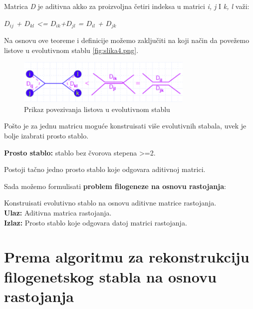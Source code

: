 \begin{teorema}
Matrica \textit{D} je aditivna akko za proizvoljna \v{c}etiri indeksa u matrici \textit{i, j} I \textit{k, l} va\v{z}i:

\begin{center}
\textit{$D_{ij}$ + $D_{kl}$ \textless= $D_{ik}$+$D_{jl}$ = $D_{il}$ + $D_{jk}$}
\end{center}

\end{teorema}

Na osnovu ove teoreme i definicije mo\v{z}emo zaklju\v{c}iti na koji na\v{c}in da pove\v{z}emo listove u evolutivnom stablu \ref{fig:slika4.png}.
\begin{figure}[h]
\centering
\includegraphics[width=0.75\textwidth]{poglavlja/7/slike/slika4.png}
\caption{Prikaz povezivanja listova u evolutivnom stablu}
\end{figure} 

Po\v{s}to je za jednu matricu mogu\'ce konstruisati vi\v{s}e evolutivnih stabala, uvek je bolje izabrati prosto stablo. 

\begin{definicija}
\textbf{Prosto stablo:} stablo bez \v{c}vorova stepena \textgreater=2.
\end{definicija}

\begin{teorema}
Postoji ta\v{c}no jedno prosto stablo koje odgovara aditivnoj matrici.
\end{teorema}

Sada mo\v{z}emo formulisati \textbf{problem filogeneze na osnovu rastojanja}:

\begin{tcolorbox}
Konstruisati evolutivno stablo na osnovu aditivne matrice rastojanja. \\
\textbf{Ulaz:} Aditivna matrica rastojanja.\\
\textbf{Izlaz:} Prosto stablo koje odgovara datoj matrici rastojanja.
\end{tcolorbox}

\section{Prema algoritmu za rekonstrukciju filogenetskog stabla na osnovu rastojanja}
\label{pazrfsnor}

